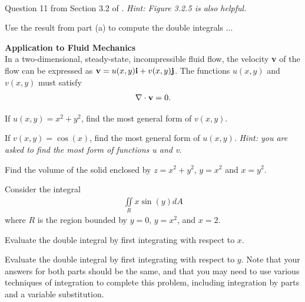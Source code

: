 \documentclass{article}
\begin{document}
\item  %
\\
\BEN
\item Question 11 from Section 3.2 of \VCT. \textit{Hint: Figure 3.2.5 is also helpful.}
\item Use the result from part (a) to compute the double integrals ...
\EEN
\item %
\textbf{Application to Fluid Mechanics} \\
In a two-dimensional, steady-state, incompressible fluid flow, the velocity \textbf{v} of the flow can be expressed as $\mathbf{v} = u(x,y)\mathbf{i} + v(x,y)\mathbf{j}$. The functions $u(x,y)$ and $v(x,y)$ must satisfy 
\begin{align*}
  \nabla\cdot\mathbf{v} = 0.
\end{align*}
\BEN
\item If $u(x,y) = x^2 + y^2$, find the most general form of $v(x,y)$. 
\item If $v(x,y) = \cos(x)$, find the most general form of $u(x,y)$.
\EEN
\textit{Hint: you are asked to find the most  form of functions u and v}.
\item %
Find the volume of the solid enclosed by $z = x^2 + y^2$, $y = x^2$ and $x=y^2$.
\item %
Consider the integral
\begin{align*}
  \iint\limits_R x\sin(y) dA
\end{align*}
 where $R$ is the region bounded by $y=0$, $y=x^2$, and $x=2$.
\BEN
\item Evaluate the double integral by first integrating with respect to $x$. 
\item Evaluate the double integral by first integrating with respect to $y$. 
\EEN
Note that your answers for both parts should be the same, and that you may need to use various techniques of integration to complete this problem, including integration by parts and a variable substitution. 
\item %
\end{document}
